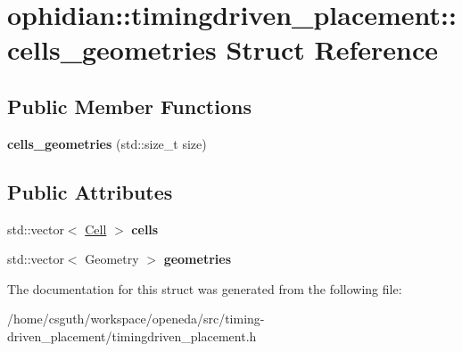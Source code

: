 \hypertarget{structophidian_1_1timingdriven__placement_1_1cells__geometries}{\section{ophidian\-:\-:timingdriven\-\_\-placement\-:\-:cells\-\_\-geometries Struct Reference}
\label{structophidian_1_1timingdriven__placement_1_1cells__geometries}
}
\subsection*{Public Member Functions}
\begin{DoxyCompactItemize}
\item 
\hypertarget{structophidian_1_1timingdriven__placement_1_1cells__geometries_ae235699810e7d8d4f6fa57e509bccfe8}{{\bfseries cells\-\_\-geometries} (std\-::size\-\_\-t size)}\label{structophidian_1_1timingdriven__placement_1_1cells__geometries_ae235699810e7d8d4f6fa57e509bccfe8}

\end{DoxyCompactItemize}
\subsection*{Public Attributes}
\begin{DoxyCompactItemize}
\item 
\hypertarget{structophidian_1_1timingdriven__placement_1_1cells__geometries_aee99e9ac21812588671789e318d3b461}{std\-::vector$<$ \hyperlink{classophidian_1_1entity_1_1entity}{Cell} $>$ {\bfseries cells}}\label{structophidian_1_1timingdriven__placement_1_1cells__geometries_aee99e9ac21812588671789e318d3b461}

\item 
\hypertarget{structophidian_1_1timingdriven__placement_1_1cells__geometries_ab4cdf584efb87caf2d5e636ed9f29174}{std\-::vector$<$ Geometry $>$ {\bfseries geometries}}\label{structophidian_1_1timingdriven__placement_1_1cells__geometries_ab4cdf584efb87caf2d5e636ed9f29174}

\end{DoxyCompactItemize}


The documentation for this struct was generated from the following file\-:\begin{DoxyCompactItemize}
\item 
/home/csguth/workspace/openeda/src/timing-\/driven\-\_\-placement/timingdriven\-\_\-placement.\-h\end{DoxyCompactItemize}
